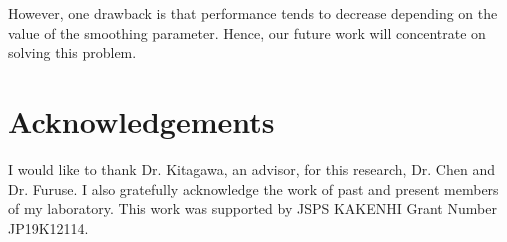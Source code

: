 \documentclass[a4paper,11pt]{report}
\theoremstyle{mytheoremstyle}
\begin{document}
However, one drawback is that performance tends to decrease depending on the value of the smoothing parameter. Hence, our future work will concentrate on solving this problem.


\chapter*{Acknowledgements}
I would like to thank Dr. Kitagawa, an advisor, for this research, Dr. Chen and Dr. Furuse. I also gratefully acknowledge the work of past and present members of my laboratory.
This work was supported by JSPS KAKENHI Grant Number JP19K12114.

\nocite{ANNH-FICC} %


\end{document}
